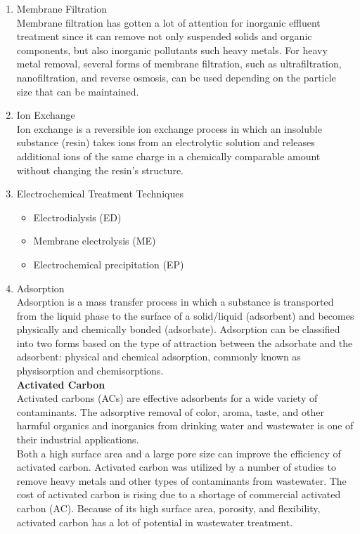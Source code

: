 \documentclass{article}
\begin{document}
\begin{enumerate}
\item Membrane Filtration\\
Membrane filtration has gotten a lot of attention for inorganic effluent treatment since it can remove not only suspended solids and organic components, but also inorganic pollutants such heavy metals. For heavy metal removal, several forms of membrane filtration, such as ultrafiltration, nanofiltration, and reverse osmosis, can be used depending on the particle size that can be maintained. 
\item Ion Exchange\\
Ion exchange is a reversible ion exchange process in which an insoluble substance (resin) takes ions from an electrolytic solution and releases additional ions of the same charge in a chemically comparable amount without changing the resin's structure.
\item Electrochemical Treatment Techniques\\
\begin{itemize}
\item Electrodialysis (ED)
\item Membrane electrolysis (ME)
\item Electrochemical precipitation (EP)
\end{itemize}
\item Adsorption\\
Adsorption is a mass transfer process in which a substance is transported from the liquid phase to the surface of a solid/liquid (adsorbent) and becomes physically and chemically bonded (adsorbate). Adsorption can be classified into two forms based on the type of attraction between the adsorbate and the adsorbent: physical and chemical adsorption, commonly known as physisorption and chemisorptions.\\
\textbf{Activated Carbon}\\
Activated carbons (ACs) are effective adsorbents for a wide variety of contaminants. The adsorptive removal of color, aroma, taste, and other harmful organics and inorganics from drinking water and wastewater is one of their industrial applications.\\
Both a high surface area and a large pore size can improve the efficiency of activated carbon. Activated carbon was utilized by a number of studies to remove heavy metals and other types of contaminants from wastewater. The cost of activated carbon is rising due to a shortage of commercial activated carbon (AC). Because of its high surface area, porosity, and flexibility, activated carbon has a lot of potential in wastewater treatment.\\ 

\end{enumerate}
\end{document}
